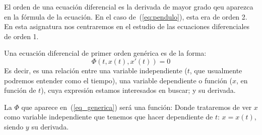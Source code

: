 El orden de una ecuación diferencial es la derivada de mayor grado qeu aparezca en la fórmula de la ecuación. En el caso de~(\ref{eq:pendulo}), esta era de orden 2. En esta asignatura nos centraremos en el estudio de las ecuaciones diferenciales de orden 1.

Una ecuación diferencial de primer orden genérica es de la forma:
\begin{equation}\label{eq_generica}
    \Phi(t,x(t), x'(t))=0
\end{equation}
Es decir, es una relación entre una variable independiente ($t$, que usualmente podremos entender como el tiempo), una variable dependiente o función ($x$, en función de $t$), cuya expresión estamos interesados en buscar; y su derivada.

La $\Phi$ que aparece en~(\ref{eq_generica}) será una función:
Donde trataremos de ver $x$ como variable independiente que tenemos que hacer dependiente de $t$: $x=x(t)$, siendo $y$ su derivada.

